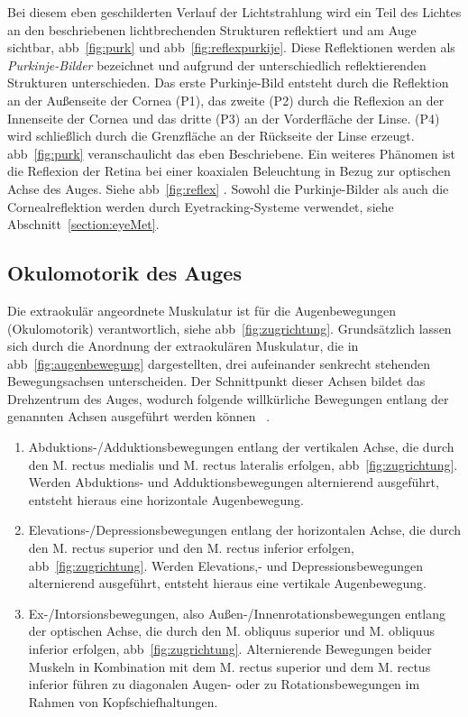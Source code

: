 Bei diesem eben geschilderten Verlauf der Lichtstrahlung wird ein Teil des Lichtes an den beschriebenen lichtbrechenden Strukturen reflektiert und am Auge sichtbar, \vgl \acs{abb}~\ref{fig:purk} und \acs{abb}~\ref{fig:reflexpurkije}. Diese Reflektionen werden als \textit{Purkinje-Bilder} bezeichnet und aufgrund der unterschiedlich reflektierenden Strukturen unterschieden. Das erste Purkinje-Bild entsteht durch die Reflektion an der Außenseite der Cornea (P1), das zweite (P2) durch die Reflexion an der Innenseite der Cornea und das dritte (P3) an der Vorderfläche der Linse. (P4) wird schließlich durch die Grenzfläche an der Rückseite der Linse erzeugt. \acl{abb}~\ref{fig:purk} veranschaulicht das eben Beschriebene. Ein weiteres Phänomen ist die Reflexion der Retina bei einer koaxialen Beleuchtung in Bezug zur optischen Achse des Auges. Siehe \acs{abb}~\ref{fig:reflex} \cite{Joos2003,Eidam2015}. Sowohl die Purkinje-Bilder als auch die Cornealreflektion werden durch Eyetracking-Systeme verwendet, siehe Abschnitt~\ref{section:eyeMet}. 



\subsection{Okulomotorik des Auges}
\label{subsection:okumot}
Die extraokulär angeordnete Muskulatur ist für die Augenbewegungen (Okulomotorik) verantwortlich, siehe \acs{abb}~\ref{fig:zugrichtung}. Grundsätzlich lassen sich durch die Anordnung der extraokulären Muskulatur, die in \acs{abb}~\ref{fig:augenbewegung} dargestellten, drei aufeinander senkrecht stehenden Bewegungsachsen unterscheiden. Der Schnittpunkt dieser Achsen bildet das Drehzentrum des Auges, wodurch folgende willkürliche Bewegungen entlang der genannten Achsen ausgeführt werden können ~\cite{Thoemke2008,Bondke2014}. 

\begin{enumerate}
\item  Abduktions-/Adduktionsbewegungen entlang der vertikalen Achse, die durch den M. rectus medialis und M. rectus lateralis erfolgen, \vgl \acs{abb}~\ref{fig:zugrichtung}. Werden Ab\-duktions- und Ad\-duktionsbewegungen alternierend ausgeführt, entsteht hieraus eine horizontale Augenbewegung. 
\item Elevations-/Depressionsbewegungen entlang der horizontalen Achse, die durch den M. rectus superior und den M. rectus inferior erfolgen,  \vgl \acs{abb}~\ref{fig:zugrichtung}. Werden Elevations,- und Depressionsbewegungen alternierend ausgeführt, entsteht hieraus eine vertikale Augenbewegung.
\item Ex-/Intorsionsbewegungen, also Außen-/Innenrotationsbewegungen entlang der optischen Achse, die durch den M. obliquus superior und M. obliquus inferior erfolgen, \vgl \acs{abb}~\ref{fig:zugrichtung}. Alternierende Bewegungen beider Muskeln in Kombination mit dem \og M. rectus superior und dem M. rectus inferior führen zu diagonalen Augen- oder zu Rotationsbewegungen im Rahmen von Kopfschiefhaltungen.
\end{enumerate}

